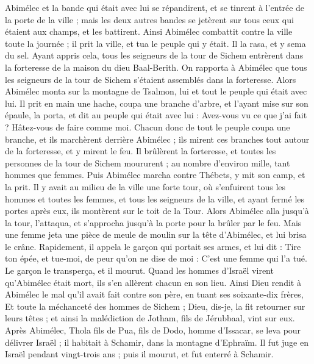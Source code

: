 \begin{multicols}{2}
Abimélec et la bande qui était avec lui se répandirent, et se tinrent à l'entrée de la porte de la ville ; mais les deux autres bandes se jetèrent sur tous ceux qui étaient aux champs, et les battirent.
Ainsi Abimélec combattit contre la ville toute la journée ; il prit la ville, et tua le peuple qui y était. Il la rasa, et y sema du sel.
Ayant appris cela, tous les seigneurs de la tour de Sichem entrèrent dans la forteresse de la maison du dieu Baal-Berith.
On rapporta à Abimélec que tous les seigneurs de la tour de Sichem s'étaient assemblés dans la forteresse.
Alors Abimélec monta sur la montagne de Tsalmon, lui et tout le peuple qui était avec lui. Il prit en main une hache, coupa une branche d'arbre, et l'ayant mise sur son épaule, la porta, et dit au peuple qui était avec lui : Avez-vous vu ce que j'ai fait ? Hâtez-vous de faire comme moi.
Chacun donc de tout le peuple coupa une branche, et ils marchèrent derrière Abimélec ; ils mirent ces branches tout autour de la forteresse, et y mirent le feu. Il brûlèrent la forteresse, et toutes les personnes de la tour de Sichem moururent ; au nombre d'environ mille, tant hommes que femmes.
Puis Abimélec marcha contre Thébets, y mit son camp, et la prit.
Il y avait au milieu de la ville une forte tour, où s'enfuirent tous les hommes et toutes les femmes, et tous les seigneurs de la ville, et ayant fermé les portes après eux, ils montèrent sur le toit de la Tour.
Alors Abimélec alla jusqu'à la tour, l'attaqua, et s'approcha jusqu'à la porte pour la brûler par le feu.
Mais une femme jeta une pièce de meule de moulin sur la tête d'Abimélec, et lui brisa le crâne.
Rapidement, il appela le garçon qui portait ses armes, et lui dit : Tire ton épée, et tue-moi, de peur qu'on ne dise de moi : C'est une femme qui l'a tué. Le garçon le transperça, et il mourut.
Quand les hommes d'Israël virent qu'Abimélec était mort, ils s'en allèrent chacun en son lieu.
Ainsi Dieu rendit à Abimélec le mal qu'il avait fait contre son père, en tuant ses soixante-dix frères,
Et toute la méchanceté des hommes de Sichem ; Dieu, dis-je, la fit retourner sur leurs têtes ; et ainsi la malédiction de Jotham, fils de Jérubbaal, vint sur eux.
\VerseOne{}Après Abimélec, Thola fils de Pua, fils de Dodo, homme d'Issacar, se leva pour délivrer Israël ; il habitait à Schamir, dans la montagne d'Ephraïm.
Il fut juge en Israël pendant vingt-trois ans ; puis il mourut, et fut enterré à Schamir.

\end{multicols}
